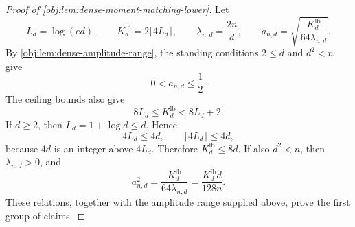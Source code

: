 \documentclass[11pt]{article}
\begin{document}

\begin{proof}[Proof of \cref{obj:lem:dense-moment-matching-lower}]
Let
\[
L_d=\log(ed),\qquad
K_d^{\mathrm{lb}}=2\lceil 4L_d\rceil,\qquad
\lambda_{n,d}=\frac{2n}{d},\qquad
a_{n,d}=\sqrt{\frac{K_d^{\mathrm{lb}}}{64\lambda_{n,d}}}.
\]
By \cref{obj:lem:dense-amplitude-range}, the standing conditions \(2\le d\) and \(d^2<n\) give
\[
0<a_{n,d}\le \frac12.
\]
The ceiling bounds also give
\[
8L_d\le K_d^{\mathrm{lb}}<8L_d+2.
\]
If \(d\ge2\), then \(L_d=1+\log d\le d\). Hence
\[
4L_d\le 4d,\qquad \lceil 4L_d\rceil\le 4d,
\]
because \(4d\) is an integer above \(4L_d\). Therefore \(K_d^{\mathrm{lb}}\le8d\). If also \(d^2<n\), then \(\lambda_{n,d}>0\), and
\[
a_{n,d}^2
=
\frac{K_d^{\mathrm{lb}}}{64\lambda_{n,d}}
=
\frac{K_d^{\mathrm{lb}}d}{128n}.
\]
These relations, together with the amplitude range supplied above, prove the first group of claims.


\end{proof}
\end{document}
